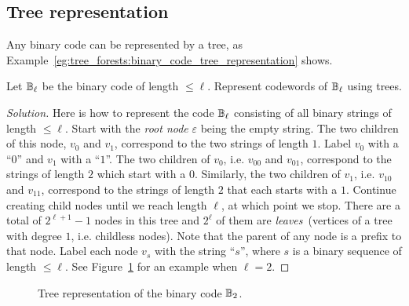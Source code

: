 
\subsection{Tree representation}

Any binary code can be represented by a tree, as
Example~\ref{eg:tree_forests:binary_code_tree_representation} shows.

\begin{example}
\label{eg:tree_forests:binary_code_tree_representation}
Let $\mathbb{B}_\ell$ be the binary code of length $\leq \ell$. Represent
codewords of $\mathbb{B}_\ell$ using trees.
\end{example}

\begin{proof}[Solution]
Here is how to represent the code $\mathbb{B}_\ell$ consisting of all binary
strings of length $\leq \ell$. Start with the
\emph{root node} $\varepsilon$\index{$\varepsilon$}
being the empty string. The two children of this node, $v_0$ and
$v_1$, correspond to the two strings of length $1$. Label $v_0$ with a
``$0$'' and $v_1$ with a ``$1$''. The two children of $v_0$,
i.e. $v_{00}$ and $v_{01}$, correspond to the strings of length $2$
which start with a $0$. Similarly, the  two children of $v_1$,
i.e. $v_{10}$ and $v_{11}$, correspond to the strings of length $2$
that each starts with a $1$. Continue creating child nodes until we
reach length $\ell$, at which point we stop. There are a total of
$2^{\ell + 1} - 1$ nodes in this tree and $2^\ell$ of them are
\emph{leaves}~(vertices of a tree with degree $1$,
i.e. childless nodes). Note that the parent of any node is a prefix to
that node. Label each node $v_s$ with the string ``$s$'', where $s$ is
a binary sequence of length $\leq \ell$. See
Figure~\ref{fig:trees_forests:tree_representation_B_2} for an example
when $\ell = 2$.
\end{proof}

\begin{figure}[!htbp]
\centering
{}
\caption{Tree representation of the binary code $\mathbb{B}_2$.}
\label{fig:trees_forests:tree_representation_B_2}
\end{figure}

